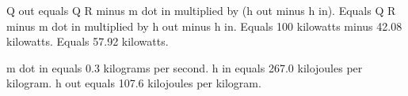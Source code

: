 Q out equals Q R minus m dot in multiplied by (h out minus h in).  
Equals Q R minus m dot in multiplied by h out minus h in.  
Equals 100 kilowatts minus 42.08 kilowatts.  
Equals 57.92 kilowatts.  

m dot in equals 0.3 kilograms per second.  
h in equals 267.0 kilojoules per kilogram.  
h out equals 107.6 kilojoules per kilogram.